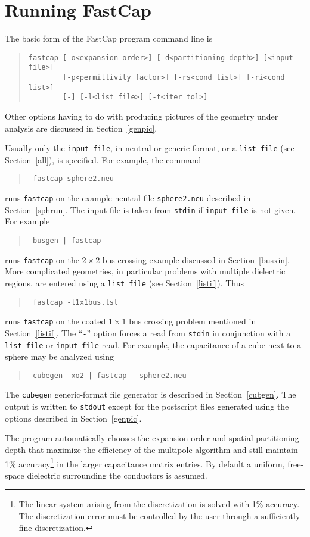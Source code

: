 %
%
\section{Running FastCap}

The basic form of the FastCap program command line is
\begin{quote}
\begin{verbatim}
fastcap [-o<expansion order>] [-d<partitioning depth>] [<input file>]
        [-p<permittivity factor>] [-rs<cond list>] [-ri<cond list>]
        [-] [-l<list file>] [-t<iter tol>]
\end{verbatim}
\end{quote}
Other options having to do with producing pictures of the geometry
under analysis are discussed in Section~\ref{genpic}.

Usually only the {\tt input file}, in neutral or generic format,
or a {\tt list file}
(see Section~\ref{all}), is specified.
For example, the command
\begin{quote}\tt
fastcap sphere2.neu
\end{quote}
runs {\tt fastcap} on the example neutral file {\tt sphere2.neu}
described in Section~\ref{sphrun}.
The input file is taken from {\tt stdin} if
{\tt input file} is not given. For example
\begin{quote}\tt
busgen | fastcap
\end{quote}
runs {\tt fastcap} on the $2\times 2$ bus crossing example discussed
in Section~\ref{busxin}.
More complicated geometries,
in particular problems with multiple dielectric regions, are entered
using a {\tt list file} (see Section~\ref{listif}). Thus
\begin{quote}\tt
fastcap -l1x1bus.lst
\end{quote}
runs {\tt fastcap} on the coated $1\times 1$ bus crossing problem mentioned in
Section~\ref{listif}. The ``{\tt -}'' option forces a read from {\tt stdin}
in conjunction with a {\tt list file} or {\tt input file} read. For
example, the capacitance of a cube next to a sphere may be analyzed
using
\begin{quote}\tt
cubegen -xo2 | fastcap - sphere2.neu
\end{quote}
The {\tt cubegen} generic-format file generator is described in
Section~\ref{cubgen}. The output is written to {\tt stdout} except for
the postscript files generated using the options described in
Section~\ref{genpic}.



The program automatically chooses the expansion
order and spatial partitioning depth that maximize the efficiency of
the multipole algorithm and still maintain 1\% accuracy\footnote{The linear
system arising from the discretization is solved with 1\% accuracy. The
discretization error must be controlled by the user through a
sufficiently fine discretization.} 
in the larger capacitance
matrix entries. By default a uniform, free-space dielectric surrounding 
the conductors is assumed.

